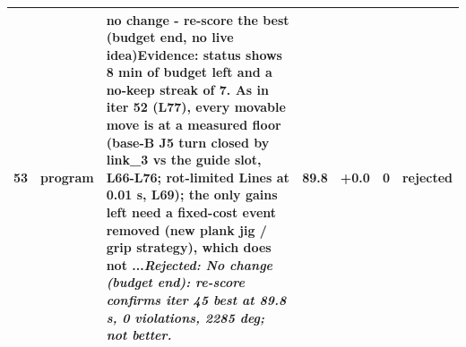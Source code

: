 {\begin{longtable}{>{\raggedleft}p{5mm} p{12mm} >{\raggedright}p{85mm} r r r p{14mm}}
$$53 & program & \textbf{no change - re-score the best (budget end, no live idea)}\newline Evidence: status shows 8 min of budget left and a no-keep streak of 7. As in iter 52 (L77), every movable move is at a measured floor (base-B J5 turn closed by link\_3 vs the guide slot, L66-L76; rot-limited Lines at 0.01 s, L69); the only gains left need a fixed-cost event removed (new plank jig / grip strategy), which does not ...\newline \textit{Rejected: No change (budget end): re-score confirms iter 45 best at 89.8 s, 0 violations, 2285 deg; not better.} & 89.8 & +0.0 & 0 & rejected \\
\bottomrule
\end{longtable}
}
